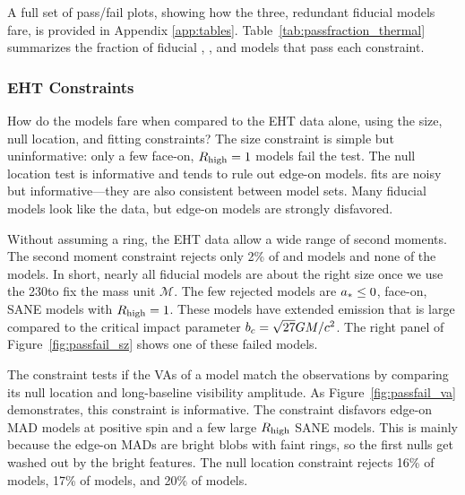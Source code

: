 A full set of pass/fail plots, showing how the three, redundant fiducial models fare, is provided in Appendix \ref{app:tables}.
Table~\ref{tab:passfraction_thermal} summarizes the fraction of fiducial \kharma, \bhac, and \hamr models that pass each constraint.

\subsubsection{EHT Constraints}

How do the models fare when compared to the EHT data alone, using the size, null location, and \mring fitting constraints?  The size constraint is simple but uninformative: only a few face-on, $R_\mathrm{high} = 1$ models fail the test.
The null location test is informative and tends to rule out edge-on models.
\Mring fits are noisy but informative---they are also consistent between model sets.
Many fiducial models look like the data, but edge-on models are strongly disfavored.


Without assuming a ring, the EHT data allow a wide range of second moments.
The second moment constraint rejects only 2\% of \kharma and \bhac models and none of the \hamr models.
In short, nearly all fiducial models are about the right size once we use the 230\GHz to fix the mass unit $\mathcal{M}$.
The few rejected models are $a_* \le 0$, face-on, SANE models with $R_\mathrm{high} = 1$.
These models have extended emission that is large compared to the critical impact parameter $b_c = \sqrt{27} GM/c^2$.
The right panel of Figure~\ref{fig:passfail_sz} shows one of these failed models.

\label{sec:vam}

The \vam constraint tests if the VAs of a model match the
observations by comparing its null location and long-baseline visibility
amplitude.
As Figure~\ref{fig:passfail_va} demonstrates, this constraint is
informative.
The constraint disfavors edge-on MAD models at positive spin and a few large $R_\mathrm{high}$ SANE models.
This is mainly because the edge-on MADs are bright blobs with faint rings, so the first nulls get washed out by the bright features.
The null location constraint rejects 16\% of \kharma models, 17\% of \bhac models, and 20\% of \hamr models.

